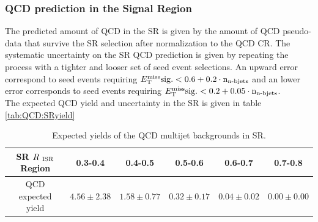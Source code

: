 \subsubsection*{QCD prediction in the Signal Region}

\indent The predicted amount of QCD in the SR is given by the amount of QCD pseudo-data that survive the SR selection after normalization to the QCD CR. The systematic uncertainty on the SR QCD prediction is given by repeating the process with a tighter and looser set of seed event selections.  An upward error correspond to seed events requiring $E_{\mathrm{T}}^{\mathrm{miss}}\rm{sig.} < 0.6 + 0.2\cdot n_{\textup{n-bjets}}$ and an lower error corresponds to seed events requiring $E_{\mathrm{T}}^{\mathrm{miss}}\rm{sig.} < 0.2 + 0.05\cdot n_{\textup{n-bjets}}$. \\

\indent The expected QCD yield and uncertainty in the SR is given in table \ref{tab:QCD:SRyield}

\begin{table}[!htbp]
  \begin{center}
    \begin{tabular}{c|c|c|c|c|c} \hline\hline
SR $R_{~\mathrm{ISR}}$ Region       & 0.3-0.4              & 0.4-0.5              & 0.5-0.6              & 0.6-0.7             & 0.7-0.8 \\ \hline
QCD expected yield & $4.56\pm2.38$ & $1.58\pm0.77$ & $0.32\pm0.17$ & $0.04\pm0.02$ & $0.00\pm0.00$ \\ \hline \hline
    \end{tabular}
  \caption{Expected yields of the QCD multijet backgrounds in SR.}
  \label{tab:QCDYields}
  \end{center}
\end{table}%
